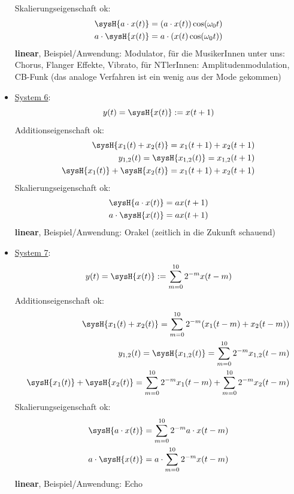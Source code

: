 \begin{Loesung}
\begin{itemize}
Skalierungseigenschaft ok:
\begin{align}
\sysH{a \cdot x(t)}= (a \cdot x(t)) \cos(\omega_0 t)\\
a \cdot \sysH{x(t)}= a \cdot (x(t) \cos(\omega_0 t))
\end{align}
\textbf{linear}, Beispiel/Anwendung: Modulator, für die MusikerInnen unter uns:
Chorus, Flanger Effekte, Vibrato, für NTlerInnen: Amplitudenmodulation, CB-Funk
(das analoge Verfahren ist ein wenig aus der Mode gekommen)
\item  \underline{System 6}:
\begin{equation}
y(t) = \sysH{x(t)}:= x(t+1)
\end{equation}
Additionseigenschaft ok:
\begin{align}
\sysH{x_1(t)+x_2(t)} = x_1(t+1) + x_2(t+1)\\
y_{1,2}(t) = \sysH{x_{1,2}(t)}= x_{1,2}(t+1)\\
\sysH{x_1(t)} + \sysH{x_2(t)} = x_1(t+1) + x_2(t+1)
\end{align}
Skalierungseigenschaft ok:
\begin{align}
\sysH{a \cdot x(t)}= a x(t+1)\\
a \cdot \sysH{x(t)}= a x(t+1)
\end{align}
\textbf{linear}, Beispiel/Anwendung: Orakel (zeitlich in die Zukunft schauend)
\item  \underline{System 7}:
\begin{equation}
y(t) = \sysH{x(t)}:= \sum_{m=0}^{10} 2^{-m} x(t-m)
\end{equation}
Additionseigenschaft ok:
\begin{align}
\sysH{x_1(t)+x_2(t)}=\sum_{m=0}^{10} 2^{-m} (x_1(t-m)+x_2(t-m))\\
y_{1,2}(t) = \sysH{x_{1,2}(t)}= \sum_{m=0}^{10} 2^{-m} x_{1,2}(t-m)\\
\sysH{x_1(t)} + \sysH{x_2(t)} = \sum_{m=0}^{10} 2^{-m} x_1(t-m) + \sum_{m=0}^{10} 2^{-m} x_2(t-m)
\end{align}
Skalierungseigenschaft ok:
\begin{align}
\sysH{a \cdot x(t)}= \sum_{m=0}^{10} 2^{-m} a \cdot x(t-m)\\
a \cdot \sysH{x(t)}= a \cdot \sum_{m=0}^{10} 2^{-m} x(t-m)
\end{align}
\textbf{linear}, Beispiel/Anwendung: Echo

\end{itemize}
\end{Loesung}
